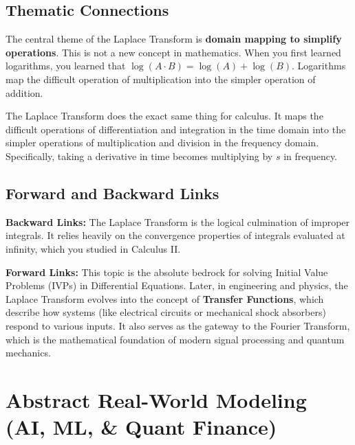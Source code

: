 \documentclass[11pt, a4paper]{article}
\theoremstyle{definition}
\theoremstyle{remark}
\begin{document}
\subsection{Thematic Connections}
The central theme of the Laplace Transform is \textbf{domain mapping to simplify operations}. This is not a new concept in mathematics. When you first learned logarithms, you learned that $\log(A \cdot B) = \log(A) + \log(B)$. Logarithms map the difficult operation of multiplication into the simpler operation of addition. 

The Laplace Transform does the exact same thing for calculus. It maps the difficult operations of differentiation and integration in the time domain into the simpler operations of multiplication and division in the frequency domain. Specifically, taking a derivative in time becomes multiplying by $s$ in frequency.

\subsection{Forward and Backward Links}
\textbf{Backward Links:} The Laplace Transform is the logical culmination of improper integrals. It relies heavily on the convergence properties of integrals evaluated at infinity, which you studied in Calculus II. 

\textbf{Forward Links:} This topic is the absolute bedrock for solving Initial Value Problems (IVPs) in Differential Equations. Later, in engineering and physics, the Laplace Transform evolves into the concept of \textbf{Transfer Functions}, which describe how systems (like electrical circuits or mechanical shock absorbers) respond to various inputs. It also serves as the gateway to the Fourier Transform, which is the mathematical foundation of modern signal processing and quantum mechanics.

\section{Abstract Real-World Modeling (AI, ML, \& Quant Finance)}
\end{document}
